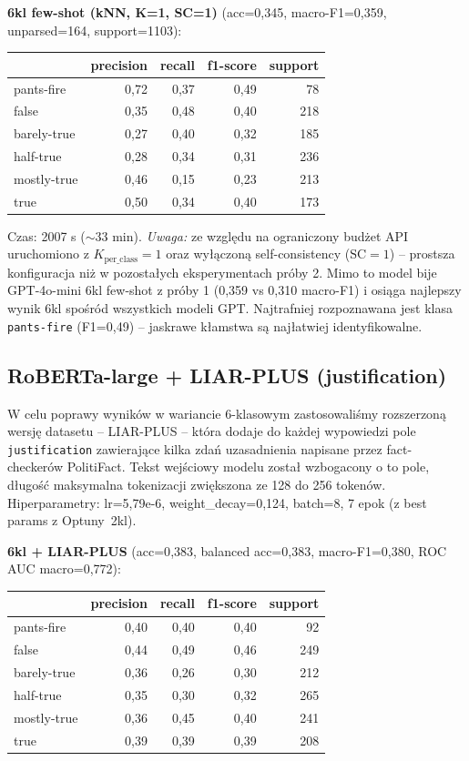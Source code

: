 \documentclass[11pt,a4paper]{article}
\begin{document}
\textbf{6kl few-shot (kNN, K=1, SC=1)} (acc=0{,}345, macro-F1=0{,}359,
unparsed=164, support=1103):
\begin{center}
\begin{tabular}{lrrrr}
\toprule
 & precision & recall & f1-score & support \\
\midrule
pants-fire   & 0{,}72 & 0{,}37 & 0{,}49 &  78 \\
false        & 0{,}35 & 0{,}48 & 0{,}40 & 218 \\
barely-true  & 0{,}27 & 0{,}40 & 0{,}32 & 185 \\
half-true    & 0{,}28 & 0{,}34 & 0{,}31 & 236 \\
mostly-true  & 0{,}46 & 0{,}15 & 0{,}23 & 213 \\
true         & 0{,}50 & 0{,}34 & 0{,}40 & 173 \\
\bottomrule
\end{tabular}
\end{center}
Czas: 2007 s ($\sim$33 min). \textit{Uwaga:} ze względu na ograniczony
budżet API uruchomiono z $K_{\text{per\_class}}=1$ oraz wyłączoną
self-consistency ($\text{SC}=1$) -- prostsza konfiguracja niż w
pozostałych eksperymentach próby 2. Mimo to model bije GPT-4o-mini 6kl
few-shot z próby 1 (0{,}359 vs 0{,}310 macro-F1) i osiąga najlepszy
wynik 6kl spośród wszystkich modeli GPT. Najtrafniej rozpoznawana jest
klasa \texttt{pants-fire} (F1=0{,}49) -- jaskrawe kłamstwa są najłatwiej
identyfikowalne.

\subsection{RoBERTa-large + LIAR-PLUS (justification)}\label{sec:liarplus}

W celu poprawy wyników w wariancie 6-klasowym zastosowaliśmy rozszerzoną wersję datasetu --
LIAR-PLUS \cite{alhindi2018} -- która dodaje do każdej wypowiedzi pole
\texttt{justification} zawierające kilka zdań uzasadnienia napisane przez
fact-checkerów PolitiFact. Tekst wejściowy modelu został wzbogacony o
to pole, długość maksymalna tokenizacji zwiększona ze 128 do 256 tokenów.
Hiperparametry: lr=5{,}79e-6, weight\_decay=0{,}124, batch=8, 7 epok
(z best params z Optuny~2kl).

\textbf{6kl + LIAR-PLUS} (acc=0{,}383, balanced acc=0{,}383,
macro-F1=0{,}380, ROC AUC macro=0{,}772):
\begin{center}
\begin{tabular}{lrrrr}
\toprule
 & precision & recall & f1-score & support \\
\midrule
pants-fire   & 0{,}40 & 0{,}40 & 0{,}40 &  92 \\
false        & 0{,}44 & 0{,}49 & 0{,}46 & 249 \\
barely-true  & 0{,}36 & 0{,}26 & 0{,}30 & 212 \\
half-true    & 0{,}35 & 0{,}30 & 0{,}32 & 265 \\
mostly-true  & 0{,}36 & 0{,}45 & 0{,}40 & 241 \\
true         & 0{,}39 & 0{,}39 & 0{,}39 & 208 \\
\bottomrule
\end{tabular}
\end{center}
\end{document}
